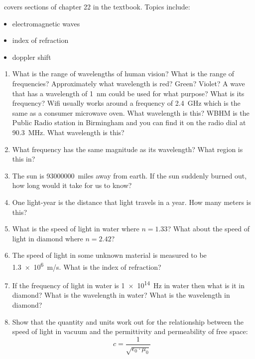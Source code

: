 \week \ covers sections of chapter 22 in the textbook. Topics include:

\begin{itemize}
	\item electromagnetic waves
	\item index of refraction
	\item doppler shift

\end{itemize}

\begin{enumerate}
\setlength\itemsep{2 in}

\item
What is the range of wavelengths of human vision? What is the range of frequencies? Approximately what wavelength is red? Green? Violet? A wave that has a wavelength of \SI{1}{nm} could be used for what purpose? What is its frequency? Wifi usually works around a frequency of \SI{2.4}{\giga\hertz} which is the same as a consumer microwave oven. What wavelength is this? WBHM is the Public Radio station in Birmingham and you can find it on the radio dial at \SI{90.3}{\mega\hertz}. What wavelength is this? \giantskip

\item
What frequency has the same magnitude as its wavelength? What region is this in?

\item
The sun is \SI{93000000}{miles} away from earth. If the sun suddenly burned out, how long would it take for us to know?

\item
One light-year is the distance that light travels in a year. How many meters is this?

\item
What is the speed of light in water where $n=1.33$? What about the speed of light in diamond where $n=2.42$? 

\item
The speed of light in some unknown material is measured to be \SI{1.3e6}{m/s}. What is the index of refraction?

\item
If the frequency of light in water is \SI{1e14}{\hertz} in water then what is it in diamond? What is the wavelength in water? What is the wavelength in diamond?

\item
Show that the quantity and units work out for the relationship between the speed of light in vacuum and the permittivity and permeability of free space: \[c = \frac{1}{\sqrt{\epsilon_0\cdot\mu_0}}\]


\end{enumerate}
